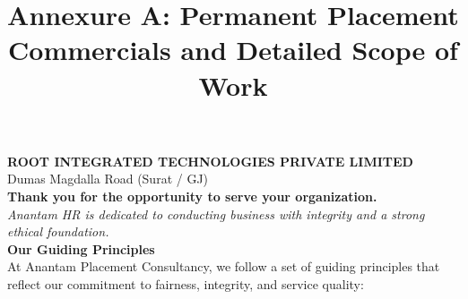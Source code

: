 \documentclass{article}
\title{\textbf{\color{primary} Annexure A: Permanent Placement Commercials and Detailed Scope of Work}}
\date{}
\begin{document}
\maketitle

\noindent\textbf{ROOT INTEGRATED TECHNOLOGIES PRIVATE LIMITED}\\
Dumas Magdalla Road (Surat / GJ)\\[1em]

\noindent\textbf{Thank you for the opportunity to serve your organization.}\\[0.5em]
\noindent\textit{Anantam HR is dedicated to conducting business with integrity and a strong ethical foundation.}\\[1em]

\noindent\textbf{\color{secondary} Our Guiding Principles}\\[0.5em]
\noindent At Anantam Placement Consultancy, we follow a set of guiding principles that reflect our commitment to fairness, integrity, and service quality:
\end{document}
